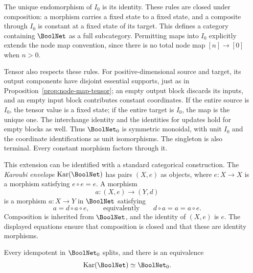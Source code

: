 The unique endomorphism of $I_0$ is its identity. These rules are closed under composition: a morphism carries a fixed state to a fixed state, and a composite through $I_0$ is constant at a fixed state of its target. This defines a category containing $\BoolNet$ as a full subcategory. Permitting maps into $I_0$ explicitly extends the node map convention, since there is no total node map $[n]\to[0]$ when $n>0$.

Tensor also respects these rules. For positive-dimensional source and target, its output components have disjoint essential supports, just as in Proposition~\ref{prop:node-map-tensor}; an empty output block discards its inputs, and an empty input block contributes constant coordinates. If the entire source is $I_0$, the tensor value is a fixed state; if the entire target is $I_0$, the map is the unique one. The interchange identity and the identities for updates hold for empty blocks as well. Thus $\BoolNet_0$ is symmetric monoidal, with unit $I_0$ and the coordinate identifications as unit isomorphisms. The singleton is also terminal. Every constant morphism factors through it.

This extension can be identified with a standard categorical construction. The \emph{Karoubi envelope} $\operatorname{Kar}(\BoolNet)$ has pairs $(X,e)$ as objects, where $e\colon X\to X$ is a morphism satisfying $e\circ e=e$. A morphism
\[
    a\colon(X,e)\longrightarrow(Y,d)
\]
is a morphism $a\colon X\to Y$ in $\BoolNet$ satisfying
\[
    a=d\circ a\circ e,
    \qquad\text{equivalently}\qquad
    d\circ a=a=a\circ e.
\]
Composition is inherited from $\BoolNet$, and the identity of $(X,e)$ is $e$. The displayed equations ensure that composition is closed and that these are identity morphisms.

\begin{proposition}\label{prop:category-idempotent-completion}
Every idempotent in $\BoolNet_0$ splits, and there is an equivalence
\[
    \operatorname{Kar}(\BoolNet)\simeq\BoolNet_0.
\]
\end{proposition}

